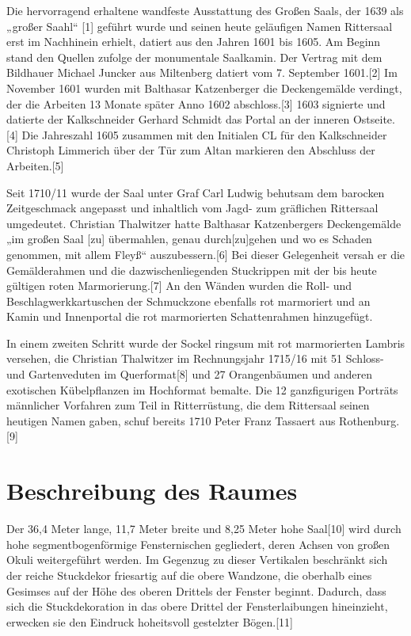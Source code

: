 \documentclass[
  a4paper,
  openany]{book}
\begin{document}
Die hervorragend erhaltene wandfeste Ausstattung des Großen Saals, der
1639 als „großer Saahl`` {[}1{]} geführt wurde und seinen heute
geläufigen Namen Rittersaal erst im Nachhinein erhielt, datiert aus den
Jahren 1601 bis 1605. Am Beginn stand den Quellen zufolge der
monumentale Saalkamin. Der Vertrag mit dem Bildhauer Michael Juncker aus
Miltenberg datiert vom 7. September 1601.{[}2{]} Im November 1601 wurden
mit Balthasar Katzenberger die Deckengemälde verdingt, der die Arbeiten
13 Monate später Anno 1602 abschloss.{[}3{]} 1603 signierte und datierte
der Kalkschneider Gerhard Schmidt das Portal an der inneren
Ostseite.{[}4{]} Die Jahreszahl 1605 zusammen mit den Initialen CL für
den Kalkschneider Christoph Limmerich über der Tür zum Altan markieren
den Abschluss der Arbeiten.{[}5{]}

Seit 1710/11 wurde der Saal unter Graf Carl Ludwig behutsam dem barocken
Zeitgeschmack angepasst und inhaltlich vom Jagd- zum gräflichen
Rittersaal umgedeutet. Christian Thalwitzer hatte Balthasar
Katzenbergers Deckengemälde „im großen Saal {[}zu{]} übermahlen, genau
durch{[}zu{]}gehen und wo es Schaden genommen, mit allem Fleyß``
auszubessern.{[}6{]} Bei dieser Gelegenheit versah er die Gemälderahmen
und die dazwischenliegenden Stuckrippen mit der bis heute gültigen roten
Marmorierung.{[}7{]} An den Wänden wurden die Roll- und
Beschlagwerkkartuschen der Schmuckzone ebenfalls rot marmoriert und an
Kamin und Innenportal die rot marmorierten Schattenrahmen hinzugefügt.

In einem zweiten Schritt wurde der Sockel ringsum mit rot marmorierten
Lambris versehen, die Christian Thalwitzer im Rechnungsjahr 1715/16 mit
51 Schloss- und Gartenveduten im Querformat{[}8{]} und 27 Orangenbäumen
und anderen exotischen Kübelpflanzen im Hochformat bemalte. Die 12
ganzfigurigen Porträts männlicher Vorfahren zum Teil in Ritterrüstung,
die dem Rittersaal seinen heutigen Namen gaben, schuf bereits 1710 Peter
Franz Tassaert aus Rothenburg.{[}9{]}

\section{\texorpdfstring{\textbf{Beschreibung des
Raumes}}{Beschreibung des Raumes}}\label{beschreibung-des-raumes}

Der 36,4 Meter lange, 11,7 Meter breite und 8,25 Meter hohe Saal{[}10{]}
wird durch hohe segmentbogenförmige Fensternischen gegliedert, deren
Achsen von großen Okuli weitergeführt werden. Im Gegenzug zu dieser
Vertikalen beschränkt sich der reiche Stuckdekor friesartig auf die
obere Wandzone, die oberhalb eines Gesimses auf der Höhe des oberen
Drittels der Fenster beginnt. Dadurch, dass sich die Stuckdekoration in
das obere Drittel der Fensterlaibungen hineinzieht, erwecken sie den
Eindruck hoheitsvoll gestelzter Bögen.{[}11{]}
\end{document}
